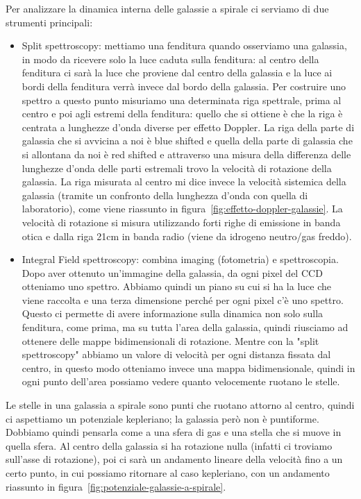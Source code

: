 Per analizzare la dinamica interna delle galassie a spirale ci serviamo di due strumenti principali:
\begin{itemize}
    \item Split spettroscopy: mettiamo una fenditura quando osserviamo una galassia, in modo da ricevere solo la luce caduta sulla fenditura: al centro della fenditura ci sarà la luce che proviene dal centro della galassia e la luce ai bordi della fenditura verrà invece dal bordo della galassia. Per costruire uno spettro a questo punto misuriamo una determinata riga spettrale, prima al centro e poi agli estremi della fenditura: quello che si ottiene è che la riga è centrata a lunghezze d’onda diverse per effetto Doppler. La riga della parte di galassia che si avvicina a noi è blue shifted e quella della parte di galassia che si allontana da noi è red shifted e attraverso una misura della differenza delle lunghezze d’onda delle parti estremali trovo la velocità di rotazione della galassia. La riga misurata al centro mi dice invece la velocità sistemica della galassia (tramite un confronto della lunghezza d’onda con quella di laboratorio), come viene riassunto in figura~\ref{fig:effetto-doppler-galassie}. La velocità di rotazione si misura utilizzando forti righe di emissione in banda otica e dalla riga 21cm in banda radio (viene da idrogeno neutro/gas freddo). 

    \item Integral Field spettroscopy: combina imaging (fotometria) e spettroscopia. Dopo aver ottenuto un’immagine della galassia, da ogni pixel del CCD otteniamo uno spettro. Abbiamo quindi un piano su cui si ha la luce che viene raccolta e una terza dimensione perché per ogni pixel c'è uno spettro. Questo ci permette di avere informazione sulla dinamica non solo sulla fenditura, come prima, ma su tutta l’area della galassia, quindi riusciamo ad ottenere delle mappe bidimensionali di rotazione. Mentre con la "split spettroscopy" abbiamo un valore di velocità per ogni distanza fissata dal centro, in questo modo otteniamo invece una mappa bidimensionale, quindi in ogni punto dell’area possiamo vedere quanto velocemente ruotano le stelle.
\end{itemize}

Le stelle in una galassia a spirale sono punti che ruotano attorno al centro, quindi  ci aspettiamo un potenziale kepleriano; la galassia però non è puntiforme. Dobbiamo quindi pensarla come a una sfera di gas e una stella che si muove in quella sfera. Al centro della galassia si ha rotazione nulla (infatti ci troviamo sull'asse di rotazione), poi ci sarà un andamento lineare della velocità fino a un certo punto, in cui possiamo ritornare al caso kepleriano, con un andamento riassunto in figura~\ref{fig:potenziale-galassie-a-spirale}.

